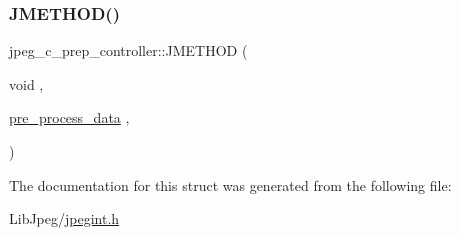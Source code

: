 \subsubsection{\texorpdfstring{JMETHOD()}{JMETHOD()}\hspace{0.1cm}{\footnotesize\ttfamily [2/2]}}
{\footnotesize\ttfamily jpeg\+\_\+c\+\_\+prep\+\_\+controller\+::\+J\+M\+E\+T\+H\+OD (\begin{DoxyParamCaption}\item[{void}]{,  }\item[{\mbox{\hyperlink{jcprepct_8c_a540c9d0777b0f72437600723ff78d9eb}{pre\+\_\+process\+\_\+data}}}]{,  }\item[{(\mbox{\hyperlink{jpeglib_8h_add2a072c54e3a51550f4975f7ddb91e7}{j\+\_\+compress\+\_\+ptr}} cinfo, \mbox{\hyperlink{jpeglib_8h_ac9d5d1b829ed51769db69a37271a7e91}{J\+S\+A\+M\+P\+A\+R\+R\+AY}} input\+\_\+buf, \mbox{\hyperlink{jmorecfg_8h_a04ed4674f6f1d0d50ec241531e38274f}{J\+D\+I\+M\+E\+N\+S\+I\+ON}} $\ast$in\+\_\+row\+\_\+ctr, \mbox{\hyperlink{jmorecfg_8h_a04ed4674f6f1d0d50ec241531e38274f}{J\+D\+I\+M\+E\+N\+S\+I\+ON}} in\+\_\+rows\+\_\+avail, \mbox{\hyperlink{jpeglib_8h_a4bf858e4d42202287e786bdec2f3b62b}{J\+S\+A\+M\+P\+I\+M\+A\+GE}} \mbox{\hyperlink{jdct_8h_ad7e4660a191b1a791748dd44d5a7a0ec}{output\+\_\+buf}}, \mbox{\hyperlink{jmorecfg_8h_a04ed4674f6f1d0d50ec241531e38274f}{J\+D\+I\+M\+E\+N\+S\+I\+ON}} $\ast$out\+\_\+row\+\_\+group\+\_\+ctr, \mbox{\hyperlink{jmorecfg_8h_a04ed4674f6f1d0d50ec241531e38274f}{J\+D\+I\+M\+E\+N\+S\+I\+ON}} out\+\_\+row\+\_\+groups\+\_\+avail)}]{ }\end{DoxyParamCaption})}



The documentation for this struct was generated from the following file\+:\begin{DoxyCompactItemize}
\item 
Lib\+Jpeg/\mbox{\hyperlink{jpegint_8h}{jpegint.\+h}}\end{DoxyCompactItemize}
